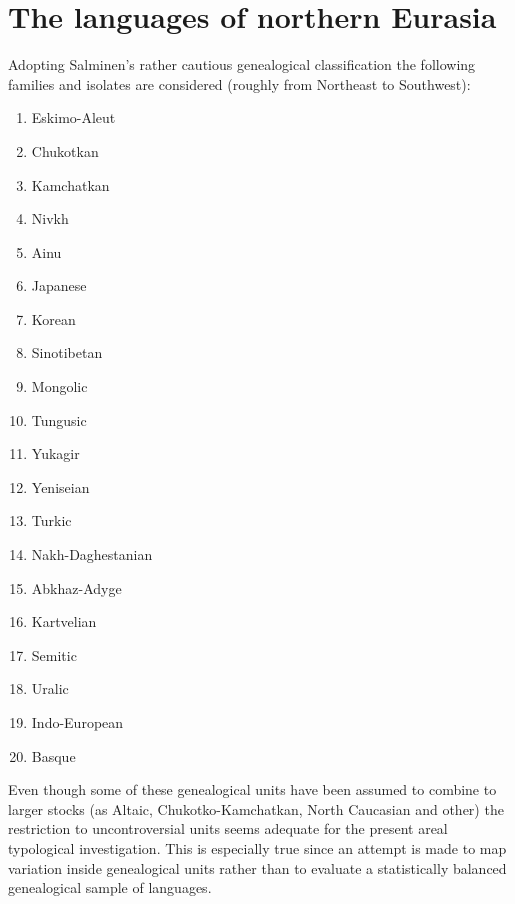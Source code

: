 \section{The languages of northern Eurasia}
Adopting Salminen's rather cautious genealogical classification the following families and isolates are considered (roughly from Northeast to Southwest):
\begin{multicols}{2}
\begin{enumerate}
\item{Eskimo-Aleut}
\item{Chukotkan}
\item{Kamchatkan}
\item{Nivkh}
\item{Ainu}
\item{Japanese}
\item{Korean}
\item{Sinotibetan}
\item{Mongolic}
\item{Tungusic}
\item{Yukagir}
\item{Yeniseian}
\item{Turkic}
\item{Nakh-Daghestanian}
\item{Abkhaz-Adyge}
\item{Kartvelian}
\item{Semitic}
\item{Uralic}
\item{Indo-European}
\item{Basque}
\end{enumerate}
\end{multicols}
Even though some of these genealogical units have been assumed to combine to larger stocks (as Altaic, Chukotko-Kamchatkan, North Caucasian and other) the restriction to uncontroversial units seems adequate for the present areal typological investigation. This is especially true since an attempt is made to map variation inside genealogical units rather than to evaluate a statistically balanced genealogical sample of languages.


